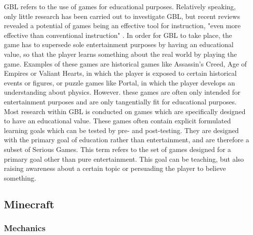 \documentclass[12pt]{report} %
\begin{document}
GBL refers to the use of games for educational purposes. Relatively speaking, only little research has been carried out to investigate GBL, but recent reviews revealed a potential of games being an effective tool for instruction, "even more effective than conventional instruction" \cite[p.~1]{wouters}. In order for GBL to take place, the game has to supersede sole entertainment purposes by having an educational value, so that the player learns something about the real world by playing the game. Examples of these games are historical games like Assassin's Creed, Age of Empires or Valiant Hearts, in which the player is exposed to certain historical events or figures, or puzzle games like Portal, in which the player develops an understanding about physics. However. these games are often only intended for entertainment purposes and are only tangentially fit for educational purposes. Most research within GBL is conducted on games which are specifically designed to have an educational value. These games often contain explicit formulated learning goals which can be tested by pre- and post-testing. They are designed with the primary goal of education rather than entertainment, and are therefore a subset of Serious Games. This term refers to the set of games designed for a primary goal other than pure entertainment. This goal can be teaching, but also raising awareness about a certain topic or persuading the player to believe something.

\subsection{Minecraft}

\subsubsection{Mechanics}
\end{document}
